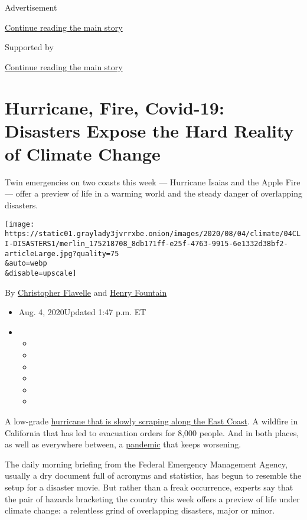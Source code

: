 Advertisement

\protect\hyperlink{after-top}{Continue reading the main story}

Supported by

\protect\hyperlink{after-sponsor}{Continue reading the main story}

\hypertarget{hurricane-fire-covid-19-disasters-expose-the-hard-reality-of-climate-change}{%
\section{Hurricane, Fire, Covid-19: Disasters Expose the Hard Reality of
Climate
Change}\label{hurricane-fire-covid-19-disasters-expose-the-hard-reality-of-climate-change}}

Twin emergencies on two coasts this week --- Hurricane Isaias and the
Apple Fire --- offer a preview of life in a warming world and the steady
danger of overlapping disasters.

\texttt{[image: https://static01.graylady3jvrrxbe.onion/images/2020/08/04/climate/04CLI-DISASTERS1/merlin\_175218708\_8db171ff-e25f-4763-9915-6e1332d38bf2-articleLarge.jpg?quality=75\\\&auto=webp\\\&disable=upscale]}

By
\href{https://www.nytimes3xbfgragh.onion/by/christopher-flavelle}{Christopher
Flavelle} and
\href{https://www.nytimes3xbfgragh.onion/by/henry-fountain}{Henry
Fountain}

\begin{itemize}
\item
  Aug. 4, 2020Updated 1:47 p.m. ET
\item
  \begin{itemize}
  \item
  \item
  \item
  \item
  \item
  \item
  \end{itemize}
\end{itemize}

A low-grade
\href{https://www.nytimes3xbfgragh.onion/2020/08/04/us/isaias-storm-updates.html}{hurricane
that is slowly scraping along the East Coast}. A wildfire in California
that has led to evacuation orders for 8,000 people. And in both places,
as well as everywhere between, a
\href{https://www.nytimes3xbfgragh.onion/interactive/2020/world/coronavirus-maps.html}{pandemic}
that keeps worsening.

The daily morning briefing from the Federal Emergency Management Agency,
usually a dry document full of acronyms and statistics, has begun to
resemble the setup for a disaster movie. But rather than a freak
occurrence, experts say that the pair of hazards bracketing the country
this week offers a preview of life under climate change: a relentless
grind of overlapping disasters, major or minor.


